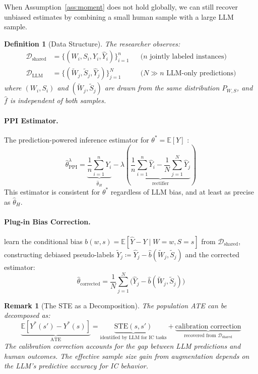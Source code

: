 \documentclass[12pt]{article}
\newtheorem{definition}{Definition}
\newtheorem{remark}{Remark}
\newcommand{\E}{\mathbb{E}}
\newcommand{\fhat}{\hat{f}}
\begin{document}
When Assumption~\ref{ass:moment} does not hold globally, we can still recover unbiased estimates by combining a small human sample with a large LLM sample.

\begin{definition}[Data Structure]
\label{def:data}
The researcher observes:
\begin{align}
  \mathcal{D}_{\text{shared}} &= \bigl\{(W_i, S_i, Y_i, \hat{Y}_i)\bigr\}_{i=1}^{n}  && \text{($n$ jointly labeled instances)} \\
  \mathcal{D}_{\text{LLM}}    &= \bigl\{(\tilde{W}_j, \tilde{S}_j, \hat{Y}_j)\bigr\}_{j=1}^{N} && \text{($N \gg n$ LLM-only predictions)}
\end{align}
where $(W_i, S_i)$ and $(\tilde{W}_j, \tilde{S}_j)$ are drawn from the same distribution $P_{W,S}$, and $\fhat$ is independent of both samples.
\end{definition}

\paragraph{PPI Estimator.}
The prediction-powered inference estimator for $\theta^* = \E[Y]$ \citep{angelopoulos2023prediction}:
\begin{equation}
  \hat{\theta}_{\text{PPI}}^{\lambda} = \underbrace{\frac{1}{n}\sum_{i=1}^{n} Y_i}_{\hat{\theta}_H} - \lambda \left(\underbrace{\frac{1}{n}\sum_{i=1}^{n} \hat{Y}_i - \frac{1}{N}\sum_{j=1}^{N} \hat{Y}_j}_{\text{rectifier}}\right)
\end{equation}
This estimator is consistent for $\theta^*$ regardless of LLM bias, and at least as precise as $\hat{\theta}_H$.

\paragraph{Plug-in Bias Correction.}
\citet{ludwig2025large} learn the conditional bias $b(w,s) = \E[\hat{Y} - Y \mid W=w, S=s]$ from $\mathcal{D}_{\text{shared}}$, constructing debiased pseudo-labels $\tilde{Y}_j \coloneqq \hat{Y}_j - \hat{b}(\tilde{W}_j, \tilde{S}_j)$ and the corrected estimator:
\begin{equation}
  \hat{\theta}_{\text{corrected}} = \frac{1}{N}\sum_{j=1}^{N} \bigl(\hat{Y}_j - \hat{b}(\tilde{W}_j, \tilde{S}_j)\bigr)
\end{equation}

\begin{remark}[The STE as a Decomposition]
The population ATE can be decomposed as:
\begin{equation}
  \underbrace{\E[Y^*(s') - Y^*(s)]}_{\text{ATE}} = \underbrace{\text{STE}(s, s')}_{\text{identified by LLM for IC tasks}} + \underbrace{\text{calibration correction}}_{\text{recovered from } \mathcal{D}_{\text{shared}}}
\end{equation}
The calibration correction accounts for the gap between LLM predictions and human outcomes. The \textit{effective sample size gain} from augmentation depends on the LLM's predictive accuracy for IC behavior.
\end{remark}
\end{document}
